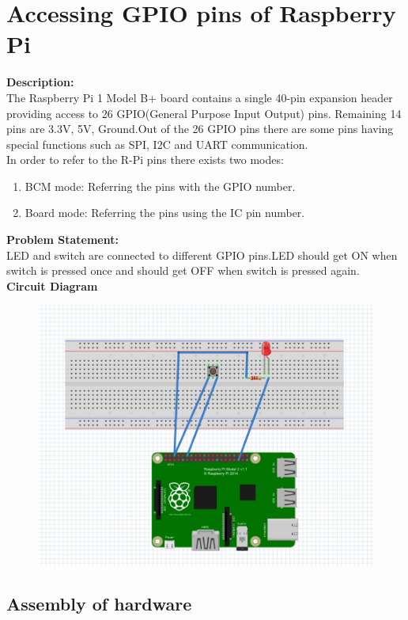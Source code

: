 \documentclass[a4paper,12pt,oneside]{book}
\begin{document}
\section{Accessing GPIO pins of Raspberry Pi}
\flushleft
\textbf{Description:} \\
The Raspberry Pi 1 Model B+ board contains a single 40-pin expansion header providing access to 26 GPIO(General Purpose Input Output) pins. Remaining 14 pins are 3.3V, 5V, Ground.Out of the 26 GPIO pins there are some pins having special functions such as SPI, I2C and UART communication. \\
In order to refer to the R-Pi pins there exists two modes:\\
\begin{enumerate}
    \item BCM mode: Referring the pins with the GPIO number.
    \item Board mode: Referring the pins using the IC pin number.
\end{enumerate}
\textbf{Problem Statement:} \\
LED and switch are connected to different GPIO pins.LED should get ON when switch is pressed once and should get OFF when switch is pressed again.\\
\textbf{Circuit Diagram}\\
\begin{figure}[H]
    \centering
    \includegraphics[scale=0.6]{GPIO}
    \caption{}
\end{figure}
\subsection*{Assembly of hardware}
\end{document}

